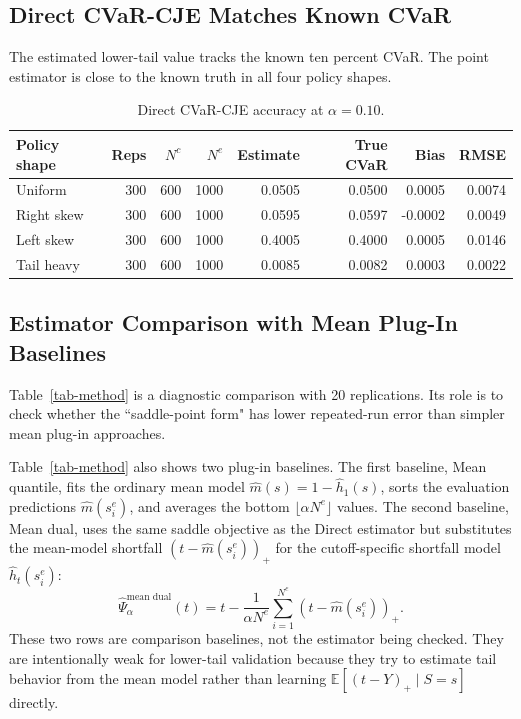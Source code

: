 \documentclass[11pt]{article}
\begin{document}
\subsection{Direct CVaR-CJE Matches Known CVaR}

The estimated lower-tail value tracks the
known ten percent CVaR. The point estimator is close to the known truth in all four policy shapes.


\begin{table}[H]
\centering
\small
\begin{tabular}{@{}lrrrrrrr@{}}
\toprule
Policy shape & Reps & \(N^c\) & \(N^e\) & Estimate & True CVaR & Bias & RMSE \\
\midrule
Uniform & 300 & 600 & 1000 & 0.0505 & 0.0500 & 0.0005 & 0.0074 \\
Right skew & 300 & 600 & 1000 & 0.0595 & 0.0597 & -0.0002 & 0.0049 \\
Left skew & 300 & 600 & 1000 & 0.4005 & 0.4000 & 0.0005 & 0.0146 \\
Tail heavy & 300 & 600 & 1000 & 0.0085 & 0.0082 & 0.0003 & 0.0022 \\
\bottomrule
\end{tabular}
\caption{Direct CVaR-CJE accuracy at \(\alpha=0.10\).}
\label{tab-cvar}
\end{table}

\subsection{Estimator Comparison with Mean Plug-In Baselines}

Table~\ref{tab-method} is a diagnostic comparison with 20 replications.  Its role is to check whether the ``saddle-point form"
has lower repeated-run error than simpler mean plug-in approaches.

Table~\ref{tab-method} also shows two plug-in baselines.  The first baseline,
Mean quantile, fits the ordinary mean model
\(\hat m(s)=1-\hat h_1(s)\), sorts the evaluation predictions
\(\hat m(s_i^e)\), and averages the bottom \(\lfloor\alpha N^e\rfloor\)
values.  The second baseline, Mean dual, uses the same saddle objective as the
Direct estimator but substitutes the mean-model shortfall
\((t-\hat m(s_i^e))_+\) for the cutoff-specific shortfall model
\(\hat h_t(s_i^e)\):
\[
  \hat\Psi_{\alpha}^{\operatorname{mean\ dual}}(t)
  =
  t
  -
  \frac{1}{\alpha N^e}
  \sum_{i=1}^{N^e}(t-\hat m(s_i^e))_+.
\]
These two rows are comparison baselines, not the estimator being checked.
They are intentionally weak for lower-tail validation because they try to
estimate tail behavior from the mean model rather than learning
\(\mathbb{E}[(t-Y)_+ \mid S=s]\) directly.
\end{document}
